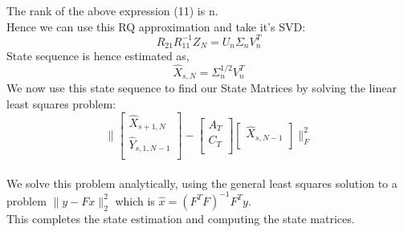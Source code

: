 \documentclass[12pt]{report}
\begin{document}
The rank of the above expression (11) is n.\\
Hence we can use this RQ approximation and take it's SVD:\\
\begin{equation*}
R_{21} R_{11}^{-1} Z_N = U_n \Sigma_n V_n^T
\end{equation*}
State sequence is hence estimated as,
\begin{equation*}
\hat{X}_{s,N} = \Sigma_n^{1/2} V_n^T
\end{equation*}
We now use this state sequence to find our State Matrices by solving the linear least squares problem:
\begin{equation*}
\|
\begin{bmatrix}
\hat{X}_{s+1,N}\\
\hat{Y}_{s,1,N-1}\\
\end{bmatrix}
- \begin{bmatrix}
A_T\\
C_T\\
\end{bmatrix}
\begin{bmatrix}
\hat{X}_{s,N-1}\\
\end{bmatrix}
\|_{F}^2
\end{equation*}
\\
We solve this problem analytically, using the general least squares solution to a problem $\| y - Fx \|_{2}^2$ which is $\hat{x} = (F^T F)^{-1}F^T y$.
\\
This completes the state estimation and computing the state matrices.
\end{document}
